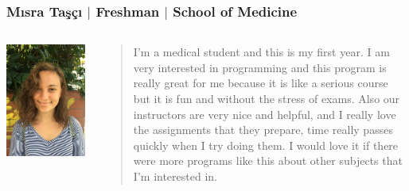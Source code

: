      \begin{frame}
        \frametitle{Mısra Taşçı $\mid$ Freshman $\mid$ School of Medicine}

        \begin{columns}
          \begin{column}{0.3\textwidth}
            \centering
            \includegraphics[width=\textwidth]{images/mtasci.jpg}
          \end{column}
          \begin{column}{0.7\textwidth}
            \Large
            \begin{quote}
            I'm a medical student and this is my first year. I am very interested in programming and this program is really great for me because it is like a serious course but it is fun and without the stress of exams. Also our instructors are very nice and helpful, and I really love the assignments that they prepare, time really passes quickly when I try doing them. I would love it if there were more programs like this about other subjects that I'm interested in.            \end{quote}
          \end{column}
        \end{columns}
      \end{frame}

